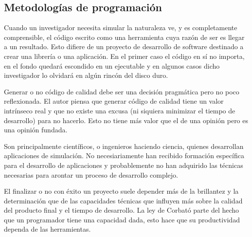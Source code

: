 \subsection{Metodologías de programación}


Cuando un investigador necesita simular la naturaleza ve, y es
completamente comprensible, el código escrito como una herramienta
cuya razón de ser es llegar a un resultado.  Esto difiere de un
proyecto de desarrollo de software destinado a crear una librería o
una aplicación.  En el primer caso el código en sí no importa, en el
fondo quedará escondido en un ejecutable y en algunos casos dicho
investigador lo olvidará en algún rincón del disco duro.

Generar o no código de calidad debe ser una decisión pragmática pero
no poco reflexionada.  El autor piensa que generar código de calidad
tiene un valor intrínseco real y que no existe una excusa (ni siquiera
minimizar el tiempo de desarrollo) para no hacerlo.  Esto no tiene más
valor que el de una opinión pero es una opinión fundada.

Son principalmente científicos, o ingenieros haciendo ciencia, quienes
desarrollan aplicaciones de simulación. No necesiariamente han
recibido formación específica para el desarrollo de aplicaciones y
probablemente no han adquirido las técnicas necesarias para arontar un
proceso de desarrollo complejo.

El finalizar o no con éxito un proyecto suele depender más de la
brillantez y la determinación que de las capacidades técnicas que
influyen más sobre la calidad del producto final y el tiempo de
desarrollo.  La ley de Corbató parte del hecho que un programador
tiene una capacidad dada, esto hace que su productividad dependa
de las herramientas. 

